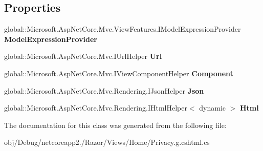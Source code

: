 \subsection*{Properties}
\begin{DoxyCompactItemize}
\item 
\mbox{\label{class_asp_net_core_1_1_views___home___privacy_a051d5e7182467de510123382cc2993b3}} 
global\+::\+Microsoft.\+Asp\+Net\+Core.\+Mvc.\+View\+Features.\+I\+Model\+Expression\+Provider {\bfseries Model\+Expression\+Provider}
\item 
\mbox{\label{class_asp_net_core_1_1_views___home___privacy_ac158e7fb6d4e3e8efc8aa51f2ca502e1}} 
global\+::\+Microsoft.\+Asp\+Net\+Core.\+Mvc.\+I\+Url\+Helper {\bfseries Url}
\item 
\mbox{\label{class_asp_net_core_1_1_views___home___privacy_a5c406264d2cfdc4ccbb1f40e12710e0e}} 
global\+::\+Microsoft.\+Asp\+Net\+Core.\+Mvc.\+I\+View\+Component\+Helper {\bfseries Component}
\item 
\mbox{\label{class_asp_net_core_1_1_views___home___privacy_afe1a2f34403ebb722226999c1de2d002}} 
global\+::\+Microsoft.\+Asp\+Net\+Core.\+Mvc.\+Rendering.\+I\+Json\+Helper {\bfseries Json}
\item 
\mbox{\label{class_asp_net_core_1_1_views___home___privacy_aee4c549b8f623b5924a9d08a4dbd7225}} 
global\+::\+Microsoft.\+Asp\+Net\+Core.\+Mvc.\+Rendering.\+I\+Html\+Helper$<$ dynamic $>$ {\bfseries Html}
\end{DoxyCompactItemize}


The documentation for this class was generated from the following file\+:\begin{DoxyCompactItemize}
\item 
obj/\+Debug/netcoreapp2./\+Razor/\+Views/\+Home/Privacy.\+g.\+cshtml.\+cs\end{DoxyCompactItemize}
